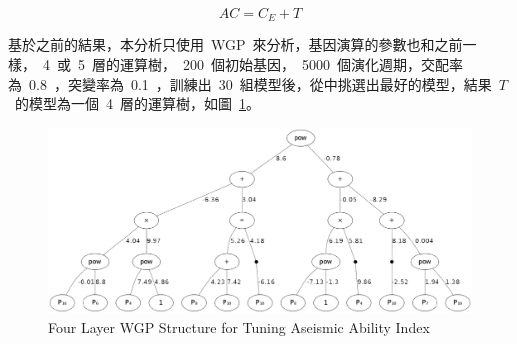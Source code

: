 
\begin{equation} AC = C_E + T  \label{eq:AC}\end{equation}

基於之前的結果，本分析只使用~WGP~來分析，基因演算的參數也和之前一樣，~4~或~5~層的運算樹，~200~個初始基因，~5000~個演化週期，交配率為~0.8~，突變率為~0.1~，訓練出~30~組模型後，從中挑選出最好的模型，結果~$T$~的模型為一個~4~層的運算樹，如圖~\ref{fig:4LWGPTuning}。

\begin{figure}[hbtp]
  \begin{center}
    \includegraphics[width=1.0\textwidth]{figures/4-layer-wgp.png}
    \caption{Four Layer WGP Structure for Tuning Aseismic Ability Index} 
    \label{fig:4LWGPTuning}
  \end{center}
\end{figure}


